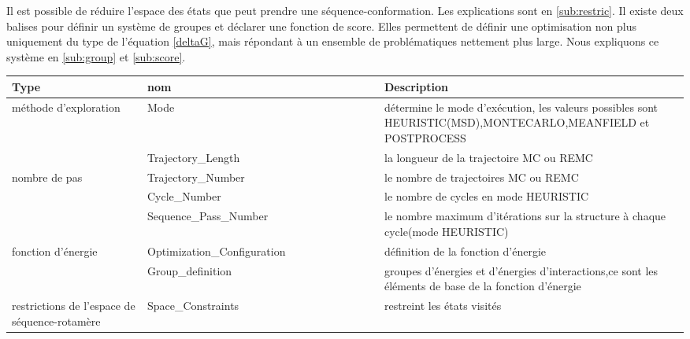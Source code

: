 Il est possible de réduire l'espace des états que peut prendre une séquence-conformation. Les explications sont en \ref{sub:restric}.  Il existe deux balises pour définir un système de groupes et déclarer une fonction de score. Elles permettent de définir une optimisation non plus uniquement du type de l'équation \ref{deltaG}, mais répondant à un ensemble de problématiques nettement plus large. Nous expliquons ce système en \ref{sub:group} et \ref{sub:score}.

    \begin{table}[!htbp]
      \centering

      \begin{tabular}{|p{0.2\linewidth}|p{0.35\linewidth}|p{0.45\linewidth}|}

        \hline
        Type   & nom & Description \\
        \hline
          méthode  d'exploration & Mode &  détermine  le mode d'exécution, les valeurs possibles sont HEURISTIC(MSD),MONTECARLO,MEANFIELD et POSTPROCESS  \\  \hline    
                        & Trajectory\_Length  &  la longueur de la trajectoire MC ou REMC\\  \cline{2-3}
        nombre de pas & Trajectory\_Number  &  le nombre de trajectoires  MC ou REMC  \\  \cline{2-3}
                        & Cycle\_Number  &    le nombre de cycles en mode HEURISTIC   \\ \cline{2-3}  
                        & Sequence\_Pass\_Number  &  le nombre maximum d'itérations sur  la structure à chaque cycle(mode HEURISTIC)    \\ \hline  

        fonction d'énergie &  Optimization\_Configuration &   définition de la fonction d'énergie\\               \cline{2-3}
                        &  Group\_definition &   groupes  d'énergies et d'énergies d'interactions,ce sont les éléments de base de la fonction d'énergie\\  \hline  
        restrictions de l'espace de  séquence-rotamère & Space\_Constraints   &  restreint les états visités \\ \hline                
                         

\end{tabular}
\end{table}

